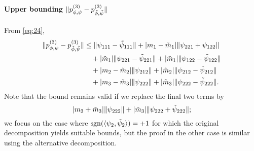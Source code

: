 \documentclass[journal]{IEEEtran}
\newcommand{\1}{\boldsymbol{1}}
\DeclareMathOperator{\sign}{sgn}
\DeclarePairedDelimiter{\ip}{\langle}{\rangle}
\DeclarePairedDelimiter{\norm}{\lVert}{\rVert}
\DeclarePairedDelimiter{\abs}{\lvert}{\rvert}
\begin{document}
\paragraph{Upper bounding $\norm{p^{(3)}_{\phi,\psi}-p^{(3)}_{\tilde{\phi},\tilde{\psi}}}$}
From \cref{eq:24},
\begin{equation}
	\label{eq:54}
	\begin{split}
		\norm{p_{\phi,\psi}^{(3)} - p_{\tilde{\phi},\tilde{\psi}}^{(3)}}%
		&\leq \norm{\psi_{111} - \tilde{\psi}_{111}}%
                  +\abs{m_1 - \tilde{m}_1}\norm{\psi_{221} + \psi_{122}}\\%
          &\quad
            + \abs{\tilde{m}_1}\norm{\psi_{221} - \tilde{\psi}_{221}}%
            + \abs{\tilde{m}_1}\norm{\psi_{122} - \tilde{\psi}_{122}}\\
          &\quad
		+\abs{m_2 - \tilde{m}_2} \norm{\psi_{212}}%
		+ \abs{\tilde{m}_2}\norm{\psi_{212} - \tilde{\psi}_{212}}\\
		&\quad +\abs{m_3 - \tilde{m}_3} \norm{\psi_{222}}%
		+ \abs{\tilde{m}_3}\norm{\psi_{222} - \tilde{\psi}_{222}}.
	\end{split}
\end{equation}
Note that the bound remains valid if we replace the final two terms by
\[ \abs{m_3+\tilde{m}_3} \norm{\psi_{222}} +\abs{\tilde{m}_3}\norm{\psi_{222}+\tilde{\psi}_{222}};\] we focus on the case where $\sign(\ip{\psi_2,\tilde{\psi}_2})=+1$ for which the original decomposition yields suitable bounds, but the proof in the other case is similar using the alternative decomposition.
\end{document}
